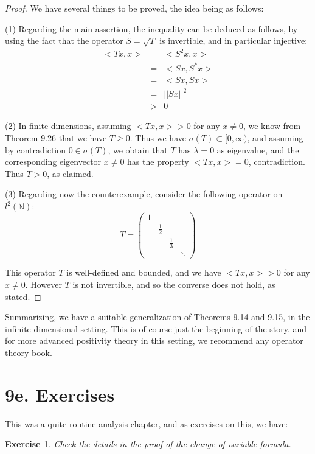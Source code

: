 \documentclass[12pt]{amsbook}
\newtheorem{exercise}[theorem]{Exercise}
\begin{document}
\begin{proof}
We have several things to be proved, the idea being as follows:

\medskip

(1) Regarding the main assertion, the inequality can be deduced as follows, by using the fact that the operator $S=\sqrt{T}$ is invertible, and in particular injective:
\begin{eqnarray*}
<Tx,x>
&=&<S^2x,x>\\
&=&<Sx,S^*x>\\
&=&<Sx,Sx>\\
&=&||Sx||^2\\
&>&0
\end{eqnarray*}

(2) In finite dimensions, assuming $<Tx,x>>0$ for any $x\neq0$, we know from Theorem 9.26 that we have $T\geq0$. Thus we have $\sigma(T)\subset[0,\infty)$, and assuming by contradiction $0\in\sigma(T)$, we obtain that $T$ has $\lambda=0$ as eigenvalue, and the corresponding eigenvector $x\neq0$ has the property $<Tx,x>=0$, contradiction. Thus $T>0$, as claimed.

\medskip

(3) Regarding now the counterexample, consider the following operator on $l^2(\mathbb N)$:
$$T=\begin{pmatrix}
1\\
&\frac{1}{2}\\
&&\frac{1}{3}\\
&&&\ddots
\end{pmatrix}$$

This operator $T$ is well-defined and bounded, and we have $<Tx,x>>0$ for any $x\neq0$. However $T$ is not invertible, and so the converse does not hold, as stated.
\end{proof}

Summarizing, we have a suitable generalization of Theorems 9.14 and 9.15, in the infinite dimensional setting. This is of course just the beginning of the story, and for more advanced positivity theory in this setting, we recommend any operator theory book.

\section*{9e. Exercises}

This was a quite routine analysis chapter, and as exercises on this, we have:

\begin{exercise}
Check the details in the proof of the change of variable formula.
\end{exercise}
\end{document}
